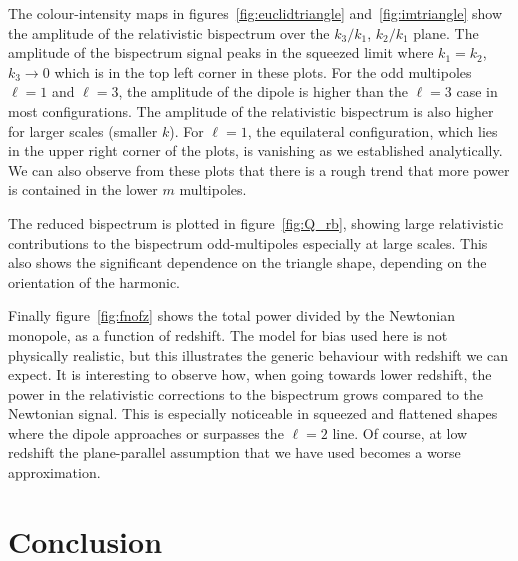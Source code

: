 {The colour-intensity maps in figures~\ref{fig:euclidtriangle} and~\ref{fig:imtriangle} show the amplitude of the relativistic bispectrum over the \(k_3/k_1\), \(k_2/k_1\) plane. The amplitude of the bispectrum signal peaks in the squeezed limit where \(k_1=k_2\), \(k_3\to 0\) which is in the top left corner in these plots. For the odd multipoles \(\ell = 1\) and \(\ell = 3\),  the amplitude of the dipole is higher than the \(\ell=3\) case in most configurations. The amplitude of the relativistic bispectrum is also higher for larger scales (smaller \(k\)). For \(\ell = 1\), the equilateral configuration, which lies in the upper right corner of the plots, is vanishing as we established analytically. 
We can also observe from these plots that there is a rough trend that more power is contained in the lower $m$ multipoles.

The reduced bispectrum is plotted in figure~\ref{fig:Q_rb}, showing large relativistic contributions to the bispectrum odd-multipoles especially at large scales. This also shows the significant dependence on the triangle shape, depending on the orientation of the harmonic.  

Finally figure~\ref{fig:fnofz} shows the total power divided by the Newtonian monopole, as a function of redshift. The model for bias used here is not physically realistic, but this illustrates the generic behaviour with redshift we can expect. It is interesting to observe how, when going towards lower redshift, the power in the relativistic corrections to the bispectrum grows compared to the Newtonian signal. This is especially noticeable in squeezed and flattened shapes where the dipole approaches or surpasses the \(\ell = 2\) line. Of course, at low redshift the plane-parallel assumption that we have used becomes a worse approximation.


\section{Conclusion}\label{sec:concl}

}
